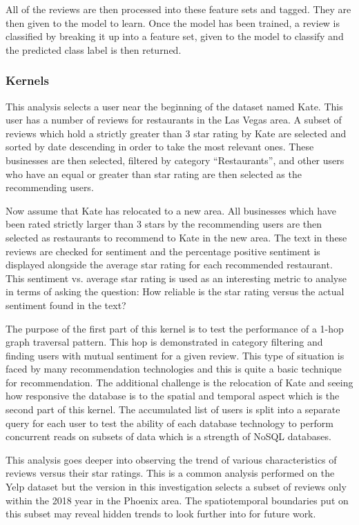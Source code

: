 All of the reviews are then processed into these feature sets and tagged. They are then given to the model to learn. Once the model has been trained, a review is classified by breaking it up into a feature set, given to the model to classify and the predicted class label is then returned.

\subsubsection{Kernels}

This analysis selects a user near the beginning of the dataset named Kate. This user has a number of reviews for restaurants in the Las Vegas area. A subset of reviews which hold a strictly greater than 3 star rating by Kate are selected and sorted by date descending in order to take the most relevant ones. These businesses are then selected, filtered by category ``Restaurants'', and other users who have an equal or greater than star rating are then selected as the recommending users.

Now assume that Kate has relocated to a new area. All businesses which have been rated strictly larger than 3 stars by the recommending users are then selected as restaurants to recommend to Kate in the new area. The text in these reviews are checked for sentiment and the percentage positive sentiment is displayed alongside the average star rating for each recommended restaurant. This sentiment vs. average star rating is used as an interesting metric to analyse in terms of asking the question: How reliable is the star rating versus the actual sentiment found in the text?

The purpose of the first part of this kernel is to test the performance of a 1-hop graph traversal pattern. This hop is demonstrated in category filtering and finding users with mutual sentiment for a given review. This type of situation is faced by many recommendation technologies and this is quite a basic technique for recommendation. The additional challenge is the relocation of Kate and seeing how responsive the database is to the spatial and temporal aspect which is the second part of this kernel. The accumulated list of users is split into a separate query for each user to test the ability of each database technology to perform concurrent reads on subsets of data which is a strength of NoSQL databases.

This analysis goes deeper into observing the trend of various characteristics of reviews versus their star ratings. This is a common analysis performed on the Yelp dataset \cite{yelp-trends-zhang} but the version in this investigation selects a subset of reviews only within the 2018 year in the Phoenix area. The spatiotemporal boundaries put on this subset may reveal hidden trends to look further into for future work.

